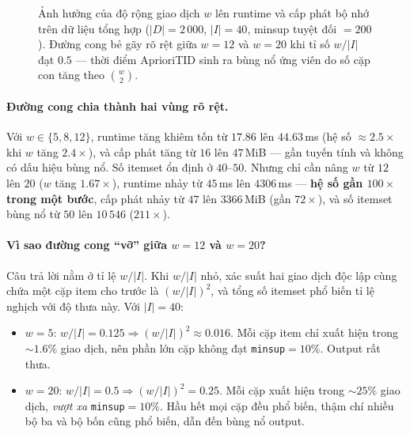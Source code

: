 \begin{figure}[htbp]
    \centering
    \caption{Ảnh hưởng của độ rộng giao dịch $w$ lên runtime và cấp phát bộ nhớ trên dữ liệu tổng hợp ($|D|=2\,000$, $|I|=40$, minsup tuyệt đối $=200$). Đường cong bẻ gãy rõ rệt giữa $w=12$ và $w=20$ khi tỉ số $w/|I|$ đạt $0.5$ --- thời điểm AprioriTID sinh ra bùng nổ ứng viên do số cặp con tăng theo $\binom{w}{2}$.}
    \label{fig:exp-f-width}
\end{figure}

\paragraph{Đường cong chia thành hai vùng rõ rệt.} Với $w \in \{5, 8, 12\}$, runtime tăng khiêm tốn từ $17.86$ lên $44.63$\,ms (hệ số $\approx 2.5\times$ khi $w$ tăng $2.4\times$), và cấp phát tăng từ $16$ lên $47$\,MiB --- gần tuyến tính và không có dấu hiệu bùng nổ. Số itemset ổn định ở $40$--$50$. Nhưng chỉ cần nâng $w$ từ $12$ lên $20$ ($w$ tăng $1.67\times$), runtime nhảy từ $45$\,ms lên $4306$\,ms --- \textbf{hệ số gần $100\times$ trong một bước}, cấp phát nhảy từ $47$ lên $3366$\,MiB (gần $72\times$), và số itemset bùng nổ từ $50$ lên $10\,546$ ($211\times$).

\paragraph{Vì sao đường cong ``vỡ'' giữa $w=12$ và $w=20$?} Câu trả lời nằm ở tỉ lệ $w/|I|$. Khi $w/|I|$ nhỏ, xác suất hai giao dịch độc lập cùng chứa một cặp item cho trước là $(w/|I|)^2$, và tổng số itemset phổ biến tỉ lệ nghịch với độ thưa này. Với $|I|=40$:
\begin{itemize}
    \item $w=5$: $w/|I| = 0.125 \Rightarrow (w/|I|)^2 \approx 0.016$. Mỗi cặp item chỉ xuất hiện trong $\sim 1.6\%$ giao dịch, nên phần lớn cặp không đạt \texttt{minsup}$=10\%$. Output rất thưa.
    \item $w=20$: $w/|I| = 0.5 \Rightarrow (w/|I|)^2 = 0.25$. Mỗi cặp xuất hiện trong $\sim 25\%$ giao dịch, \emph{vượt xa} \texttt{minsup}$=10\%$. Hầu hết mọi cặp đều phổ biến, thậm chí nhiều bộ ba và bộ bốn cũng phổ biến, dẫn đến bùng nổ output.
\end{itemize}

